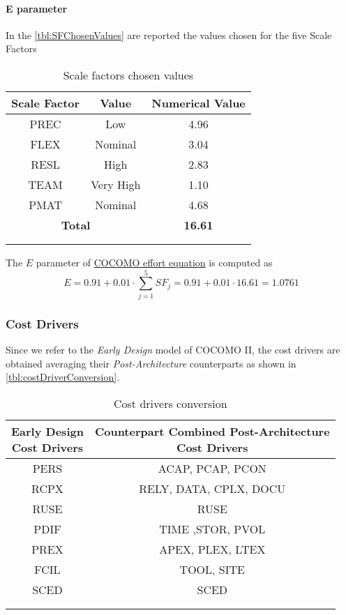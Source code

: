 \paragraph{E parameter}In the \autoref{tbl:SFChosenValues} are reported the values chosen for the five Scale Factors
\begin{longtable}{ccc}
\toprule
Scale Factor&Value&Numerical Value\\
\midrule
PREC&Low&4.96\\
FLEX&Nominal&3.04\\
RESL&High&2.83\\
TEAM&Very High&1.10\\
PMAT&Nominal&4.68\\
\midrule
\multicolumn{2}{c}{\textbf{Total}}&\textbf{16.61}\\
\bottomrule\\
\caption{\label{tbl:SFChosenValues}Scale factors chosen values}
\end{longtable}
The $E$ parameter of \hyperref[par:cocomoEquation]{COCOMO effort equation} is computed as
$$E = 0.91 + 0.01 \cdot \sum_{j=1}^{5}{SF_j} = 0.91+0.01\cdot 16.61 = 1.0761$$


\subsubsection{Cost Drivers}
Since we refer to the \emph{Early Design} model of COCOMO II, the cost drivers are obtained averaging their \emph{Post-Architecture} counterparts as shown in \autoref{tbl:costDriverConversion}.
\begin{longtable}{cc}
\toprule
\specialcell{Early Design\\Cost Drivers} & \specialcell{Counterpart Combined Post-Architecture\\Cost Drivers}\\
\midrule
PERS&ACAP, PCAP, PCON\\
RCPX&RELY, DATA, CPLX, DOCU\\
RUSE&RUSE\\
PDIF&TIME ,STOR, PVOL\\
PREX&APEX, PLEX, LTEX\\
FCIL&TOOL, SITE\\
SCED&SCED\\
\bottomrule\\
\caption{\label{tbl:costDriverConversion}Cost drivers conversion}
\end{longtable}

